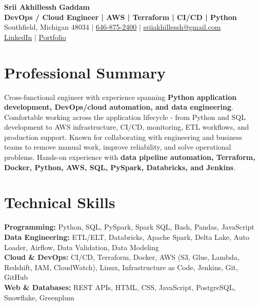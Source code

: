 \documentclass[letterpaper,10pt]{article}
\begin{document}
\fontsize{9.35pt}{10.45pt}\selectfont

\begin{center}
    {\LARGE \textbf{Srii Akhillessh Gaddam}} \\[-1pt]
    \textbf{DevOps / Cloud Engineer | AWS | Terraform | CI/CD | Python} \\[2pt]
    Southfield, Michigan 48034 $|$
    \href{tel:6468752400}{646-875-2400} $|$
    \href{mailto:sriiakhillessh@gmail.com}{sriiakhillessh@gmail.com} \\[1pt]
    \href{https://www.linkedin.com/in/srii-akhiilessh-gaddam-b48668191/}{LinkedIn} $|$
    \href{https://sriiakhillesshg.github.io/portfolio/}{Portfolio}
\end{center}
\vspace{-8pt}

\section{Professional Summary}
\small{Cross-functional engineer with experience spanning \textbf{Python application development, DevOps/cloud automation, and data engineering}. Comfortable working across the application lifecycle - from Python and SQL development to AWS infrastructure, CI/CD, monitoring, ETL workflows, and production support. Known for collaborating with engineering and business teams to remove manual work, improve reliability, and solve operational problems. Hands-on experience with \textbf{data pipeline automation, Terraform, Docker, Python, AWS, SQL, PySpark, Databricks, and Jenkins}.}

\section{Technical Skills}
\small{
\textbf{Programming:} Python, SQL, PySpark, Spark SQL, Bash, Pandas, JavaScript \\
\textbf{Data Engineering:} ETL/ELT, Databricks, Apache Spark, Delta Lake, Auto Loader, Airflow, Data Validation, Data Modeling \\
\textbf{Cloud \& DevOps:} CI/CD, Terraform, Docker, AWS (S3, Glue, Lambda, Redshift, IAM, CloudWatch), Linux, Infrastructure as Code, Jenkins, Git, GitHub \\
\textbf{Web \& Databases:} REST APIs, HTML, CSS, JavaScript, PostgreSQL, Snowflake, Greenplum
}
\end{document}
